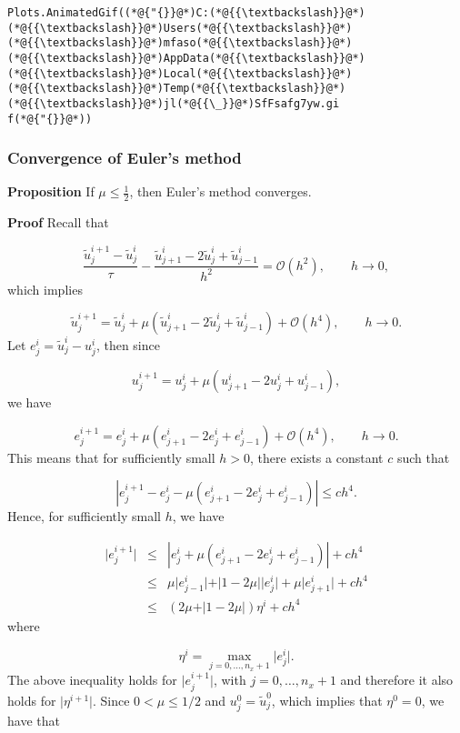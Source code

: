\documentclass[12pt,landscape]{article}
\begin{document}
{\begin{lstlisting}
Plots.AnimatedGif((*@{"{}}@*)C:(*@{{\textbackslash}}@*)(*@{{\textbackslash}}@*)Users(*@{{\textbackslash}}@*)(*@{{\textbackslash}}@*)mfaso(*@{{\textbackslash}}@*)(*@{{\textbackslash}}@*)AppData(*@{{\textbackslash}}@*)(*@{{\textbackslash}}@*)Local(*@{{\textbackslash}}@*)(*@{{\textbackslash}}@*)Temp(*@{{\textbackslash}}@*)(*@{{\textbackslash}}@*)jl(*@{{\_}}@*)SfFsafg7yw.gi
f(*@{"{}}@*))
\end{lstlisting}


\subsubsection{Convergence of Euler's method}
\textbf{Proposition} If $\mu \leq \frac{1}{2}$, then Euler's method converges.

\textbf{Proof} Recall that

\[
\frac{\tilde{u}^{i+1}_j - \tilde{u}^i_j}{\tau} - \frac{\tilde{u}^{i}_{j+1} - 2\tilde{u}^i_j + \tilde{u}^i_{j-1}}{h^2}  =  \mathcal{O}(h^2), \qquad h \to 0,
\]
which implies

\[
\tilde{u}^{i+1}_j = \tilde{u}^i_j + \mu \left(\tilde{u}^{i}_{j+1} - 2\tilde{u}^i_j + \tilde{u}^i_{j-1}\right)  +  \mathcal{O}(h^4), \qquad h \to 0.
\]
Let $e^i_j = \tilde{u}^i_j - u^i_j$, then since

\[
u^{i+1}_j = u^i_j + \mu \left( u^{i}_{j+1} - 2u^i_j + u^i_{j-1}  \right),
\]
we have

\[
e^{i+1}_j = e^i_j + \mu \left( e^{i}_{j+1} - 2e^i_j + e^i_{j-1}  \right) + \mathcal{O}(h^4), \qquad h \to 0.
\]
This means that for sufficiently small $h > 0$, there exists a constant $c$ such that 

\[
\left\vert e^{i+1}_j -  e^i_j - \mu \left( e^{i}_{j+1} - 2e^i_j + e^i_{j-1}  \right) \right\vert  \leq ch^4.
\]
Hence, for sufficiently small $h$, we have


\begin{eqnarray*}
\vert e^{i+1}_j \vert &\leq& \left\vert e^i_j + \mu ( e^{i}_{j+1} - 2e^i_j + e^i_{j-1} ) \right\vert + ch^4\\
 & \leq & \mu \vert e^i_{j-1} \vert + \vert 1 - 2\mu \vert \vert e^i_{j} \vert  + \mu \vert e^i_{j+1} \vert + ch^4  \\
 & \leq & \left(2\mu  + \vert 1 - 2\mu \vert \right) \eta^i  + ch^4  
\end{eqnarray*}
where 

\[
\eta^{i} = \max_{j = 0, \ldots, n_x+1}\vert e^i_j \vert.
\]
The above inequality holds for $\vert e^{i+1}_j \vert$, with $j = 0, \ldots, n_x+1$ and therefore it also holds for $\vert  \eta^{i+1} \vert$. Since $0 < \mu \leq 1/2$ and $u^0_j = \tilde{u}^0_j$, which implies that $\eta^0=0$, we have that

}
\end{document}
